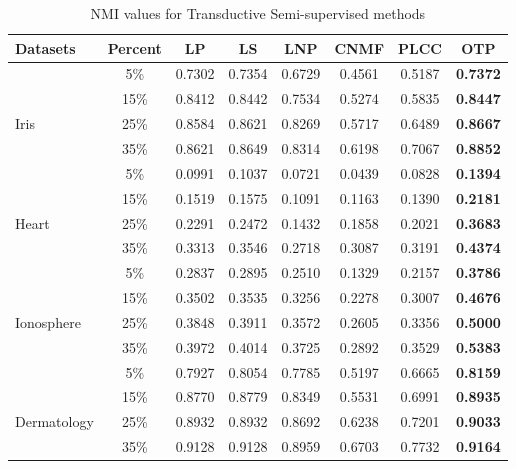 \documentclass[conference]{IEEEtran}
\begin{document}
\begin{table}[h]
\caption{NMI values for Transductive Semi-supervised methods}
\small
\centering
\setlength\tabcolsep{1.3pt}
\setlength\extrarowheight{-2pt}
\begin{tabular}{lccccccc}
\hline
Datasets    & Percent  & LP      & LS      & LNP     & CNMF    & PLCC     & OTP            \\ \toprule 
            & 5\%      & 0.7302  & 0.7354  & 0.6729  &0.4561   &0.5187    & \textbf{0.7372} \\ 
            & 15\%     & 0.8412  & 0.8442  & 0.7534  &0.5274   &0.5835    & \textbf{0.8447} \\ 
Iris        & 25\%     & 0.8584  & 0.8621  & 0.8269  &0.5717   &0.6489    & \textbf{0.8667}  \\             
            & 35\%     & 0.8621  & 0.8649  & 0.8314  &0.6198   &0.7067    & \textbf{0.8852} \\ 
            
            
            & 5\%   & 0.0991 & 0.1037 & 0.0721        &0.0439    &0.0828    &\textbf{0.1394} \\
            & 15\%  & 0.1519 & 0.1575 & 0.1091        &0.1163    &0.1390    &\textbf{0.2181} \\
Heart       & 25\%  & 0.2291 & 0.2472 & 0.1432        &0.1858    &0.2021    &\textbf{0.3683} \\
            & 35\%  & 0.3313 & 0.3546 & 0.2718        &0.3087    &0.3191    &\textbf{0.4374} \\ 

        
            & 5\%   & 0.2837  & 0.2895 & 0.2510     &0.1329    &0.2157   & \textbf{0.3786} \\
            & 15\%  & 0.3502  & 0.3535 & 0.3256     &0.2278    &0.3007   & \textbf{0.4676} \\ 
Ionosphere  & 25\%  & 0.3848  & 0.3911 & 0.3572     &0.2605    &0.3356   & \textbf{0.5000} \\ 
            & 35\%  & 0.3972  & 0.4014 & 0.3725     &0.2892    &0.3529   & \textbf{0.5383}\\ 
        
            & 5\%   & 0.7927  & 0.8054 & 0.7785     &0.5197    &0.6665   & \textbf{0.8159} \\
            & 15\%  & 0.8770  & 0.8779 & 0.8349     &0.5531    &0.6991   & \textbf{0.8935} \\
Dermatology & 25\%  & 0.8932  & 0.8932 & 0.8692     &0.6238    &0.7201   & \textbf{0.9033} \\ 
            & 35\%  & 0.9128  & 0.9128 & 0.8959     &0.6703    &0.7732   & \textbf{0.9164} \\  


\end{tabular}
\end{table}
\end{document}

